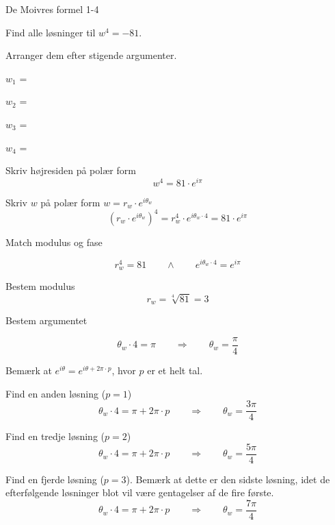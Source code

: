 \documentclass{article}
\begin{document}
\begin{exercise}{De Moivres formel 1-4}

Find alle løsninger til $w^4=-81$. 

Arranger dem efter stigende argumenter.

$w_1$ = 		

$w_2$ = 		

$w_3$ = 		

$w_4$ = 	 


\hint 

Skriv højresiden på polær form
\[
w^4 = 81 \cdot e^{i \pi}
\]


\hint

Skriv $w$ på polær form $w = r_w \cdot e^{i \theta_w}$
\[
\left(r_w \cdot e^{i \theta_w}\right)^4 = r_w^4 \cdot e^{i \theta_w \cdot 4} = 81 \cdot e^{i \pi}
\]

\hint 
Match modulus og fase

\[
r_w^4 = 81 \qquad \wedge \qquad e^{i \theta_w \cdot 4} = e^{i \pi}
\]

\hint

Bestem modulus
\[
r_w  =  \sqrt[4]{81} = 3
\]

\hint

Bestem argumentet

\[
\theta_w \cdot 4 = \pi \qquad \Rightarrow \qquad  \theta_w = \frac{\pi}{4}
\]

\hint

Bemærk at $e^{i \theta} = e^{i \theta + 2 \pi \cdot p}$, hvor $p$ er et helt tal.

\hint

Find en anden løsning ($p=1$)
\[
\theta_w \cdot 4 = \pi  + 2 \pi \cdot p \qquad \Rightarrow \qquad  \theta_w = \frac{3 \pi}{4}
\]

\hint

Find en tredje løsning ($p=2$)
\[
\theta_w \cdot 4 = \pi  + 2 \pi \cdot p \qquad \Rightarrow  \qquad  \theta_w = \frac{5 \pi}{4}
\]

\hint

Find en fjerde løsning ($p=3$). 
Bemærk at dette er den sidste løsning, idet de efterfølgende 
løsninger blot vil være gentagelser af de fire første. 
\[
\theta_w \cdot 4 = \pi  + 2 \pi \cdot p \qquad \Rightarrow  \qquad  \theta_w = \frac{7 \pi}{4}
\]

\end{exercise}
\end{document}
